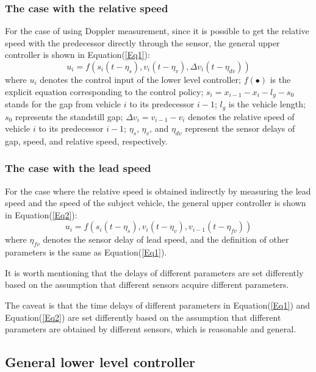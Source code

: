 \documentclass[a4paper]{cas-sc}
\begin{document}
\subsubsection{The case with the relative speed}
\label{Section 2.2.1}

For the case of using Doppler measurement, since it is possible to get the relative speed with the predecessor directly through the sensor, the general upper controller is shown in Equation(\ref{Eq1}):
\begin{equation}
  u_i=f(s_i\left(t-\eta_s\right),v_i\left(t-\eta_v\right),\Delta v_i(t-\eta_{dv}))
  \label{Eq1}
\end{equation}
where $u_i$ denotes the control input of the lower level controller; $f(\bullet)$ is the explicit equation corresponding to the control policy; $s_i=x_{i-1}-x_i-l_g-s_0$ stands for the gap from vehicle $i$ to its predecessor $i-1$; $l_g$ is the vehicle length; $s_0$ represents the standstill gap; $\Delta v_i=v_{i-1}-v_i$ denotes the relative speed of vehicle $i$ to its predecessor $i-1$; $\eta_s$, $\eta_v$, and $\eta_{dv}$ represent the sensor delays of gap, speed, and relative speed, respectively.

\subsubsection{The case with the lead speed}
\label{Section 2.2.2}

For the case where the relative speed is obtained indirectly by measuring the lead speed and the speed of the subject vehicle, the general upper controller is shown in Equation(\ref{Eq2}):
\begin{equation}
  u_i=f(s_i\left(t-\eta_s\right),v_i\left(t-\eta_v\right), v_{i-1}(t-\eta_{fv}))
  \label{Eq2}
\end{equation}
where $\eta_{fv}$ denotes the sensor delay of lead speed, and the definition of other parameters is the same as Equation(\ref{Eq1}).

It is worth mentioning that the delays of different parameters are set differently based on the assumption that different sensors acquire different parameters.

The caveat is that the time delays of different parameters in Equation(\ref{Eq1}) and Equation(\ref{Eq2}) are set differently based on the assumption that different parameters are obtained by different sensors, which is reasonable and general.




\subsection{General lower level controller}
\label{Section 2.3}
\end{document}

